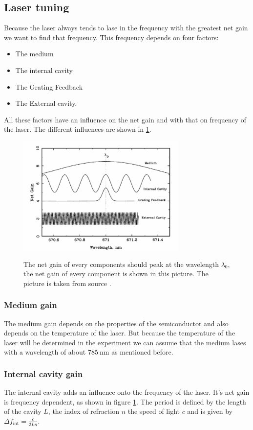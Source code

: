 \subsection{Laser tuning}
Because the laser always tends to lase in the frequency with the greatest net gain we want to find that frequency.
This frequency depends on four factors:
\begin{itemize}
    \item The medium
    \item The internal cavity
    \item The Grating Feedback
    \item The External cavity.
\end{itemize}
All these factors have an influence on the net gain and with that on frequency of the laser.
The different influences are shown in \ref{fig:netgain}.
\begin{figure}
    \centering
    \caption{The net gain of every components should peak at the wavelength $\lambda_0$, the net gain of every component is shown in this picture. The picture is taken from source \cite[6]{anleitung_laser}.}
    \includegraphics[width=0.75\textwidth]{content/data/netgain.png}
    \label{fig:netgain}
\end{figure}
\FloatBarrier
\subsubsection{Medium gain}
The medium gain depends on the properties of the semiconductor and also depends on the temperature of the laser.
But because the temperature of the laser will be determined in the experiment we can assume that the medium lases with a wavelength of about $\SI{785}{\nano\meter}$ as mentioned before.

\subsubsection{Internal cavity gain}
The internal cavity adds an influence onto the frequency of the laser.
It's net gain is frequency dependent, as shown in figure \ref{fig:netgain}.
The period is defined by the length of the cavity $L$, the index of refraction $n$ the speed of light $c$ and is given by
$\Delta f_\text{int} = \frac{c}{2Ln}$.

